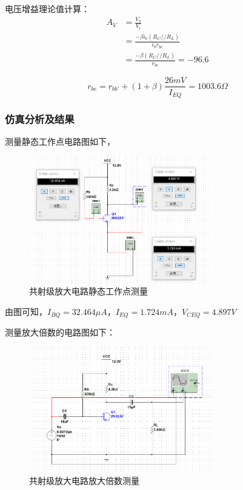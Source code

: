 \documentclass[10pt, conference, compsocconf, a4paper]{IEEEtran}
\begin{document}
电压增益理论值计算：
\begin{equation}
  \begin{split}
    A_V&=\frac{V_o}{V_i}\\
    &=\frac{-\beta i_b(R_C//R_L)}{i_br_{be}}\\
    &=\frac{-\beta(R_C//R_L)}{r_{be}}=-96.6
  \end{split}
\end{equation}

\begin{equation}
  r_{be}=r_{bb'}+(1+\beta)\frac{26mV}{I_{EQ}}=1003.6\Omega
\end{equation}

\subsubsection{仿真分析及结果}

测量静态工作点电路图如下，\par
\begin{figure}[h]
  \includegraphics[width=8cm]{img/a.png}
  \caption{共射级放大电路静态工作点测量}
\end{figure}
由图可知，$I_{BQ}=32.464\mu A，I_{EQ}=1.724mA，V_{CEQ}=4.897V$

测量放大倍数的电路图如下：\par

\begin{figure}[h]
  \includegraphics[width=8cm]{img/b.png}
  \caption{共射级放大电路放大倍数测量}
\end{figure}
\end{document}
